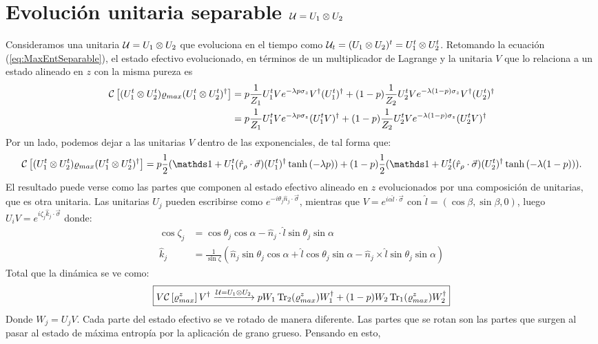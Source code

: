 \section{Evolución unitaria separable $\mathcal{U}=U_{1}\otimes U_{2}$}
Consideramos una unitaria $\mathcal{U}=U_{1}\otimes U_{2}$ que evoluciona en el tiempo como $\mathcal{U}_{t}=(U_{1}\otimes U_{2})^{t}=U_{1}^{t}\otimes U_{2}^{t}$. Retomando la ecuación (\ref{eq:MaxEntSeparable}), el estado efectivo evolucionado, en términos de un multiplicador de Lagrange y la unitaria $V$ que lo relaciona a un estado alineado en $z$ con la misma pureza es
\begin{align*}
    \mathcal{C}\left[(U_{1}^{t}\otimes U_{2}^{t})\varrho_{max}(U_{1}^{t}\otimes U_{2}^{t})^{\dag}\right]&=p\frac{1}{Z_{1}}U_{1}^{t}V e^{-\lambda p \sigma_{z}}V^{\dag}(U_{1}^t)^{\dag}+(1-p)\frac{1}{Z_{2}}U_{2}^{t}Ve^{-\lambda (1-p)\sigma_{z}}V^{\dag}(U_{2}^t)^{\dag}\\
    &=p\frac{1}{Z_{1}}U_{1}^{t}V e^{-\lambda p \sigma_{z}}(U_{1}^tV)^{\dag}+(1-p)\frac{1}{Z_{2}}U_{2}^{t}Ve^{-\lambda (1-p)\sigma_{z}}(U_{2}^tV)^{\dag}\\
\end{align*}
Por un lado, podemos dejar a las unitarias $V$ dentro de las exponenciales, de tal forma que:
\begin{equation}
    \CG{(U_{1}^{t}\otimes U_{2}^{t})\varrho_{max}(U_{1}^{t}\otimes U_{2}^{t})^{\dag}}=p\frac{1}{2}(\Id+U_{1}^{t}(\hat{r}_{\rho}\cdot\vec{\sigma})(U_{1}^{t})^{\dag}\tanh{(-\lambda p)})+(1-p)\frac{1}{2}(\Id+U_{2}^{t}(\hat{r}_{\rho}\cdot\vec{\sigma})(U_{2}^{t})^{\dag}\tanh{(-\lambda (1-p))}).
\end{equation}
El resultado puede verse como las partes que componen al estado efectivo alineado en $z$ evolucionados por una composición de unitarias, que es otra unitaria. Las unitarias $U_{j}$ pueden escribirse como $e^{-i\theta_{j} \hat{n}_{j}\cdot\vec{\sigma}}$, mientras que $V=e^{i\alpha\hat{l}\cdot\vec{\sigma}}$ con $\hat{l}=(\cos{\beta},\sin{\beta},0)$, luego $U_{i}V=e^{i\zeta_{j} \hat{k}_{j}\cdot \vec{\sigma}}$ donde:
\begin{align*}
    \cos{\zeta_{j} }&=\cos{\theta_{j}}\cos{\alpha}-\hat{n}_{j}\cdot \hat{l}\sin{\theta_{j}}\sin{\alpha}\\
    \hat{k}_{j} &=\frac{1}{\sin{\zeta}}(\hat{n}_{j}\sin{\theta_{j}}\cos{\alpha}+\hat{l}\cos{\theta_{j}}\sin{\alpha}-\hat{n}_{j}\times \hat{l}\sin{\theta_{j}}\sin{\alpha})
\end{align*}
Total que la dinámica se ve como:
\begin{equation}
    \boxed{V\mathcal{C}\left[\varrho_{max}^{z}\right]V^{\dag} \xrightarrow{\mathcal{U}=U_{1}\otimes U_{2}} pW_{1}\Tr_{2}(\varrho_{max}^{z})W_{1}^{\dag}+(1-p)W_{2}\Tr_{1}(\varrho_{max}^{z})W_{2}^{\dag}}
\end{equation}
Donde $W_{j}=U_{j}V$. Cada parte del estado efectivo se ve rotado de manera diferente. Las partes que se rotan son las partes que surgen al pasar al estado de máxima entropía por la aplicación de grano grueso. Pensando en esto, 


